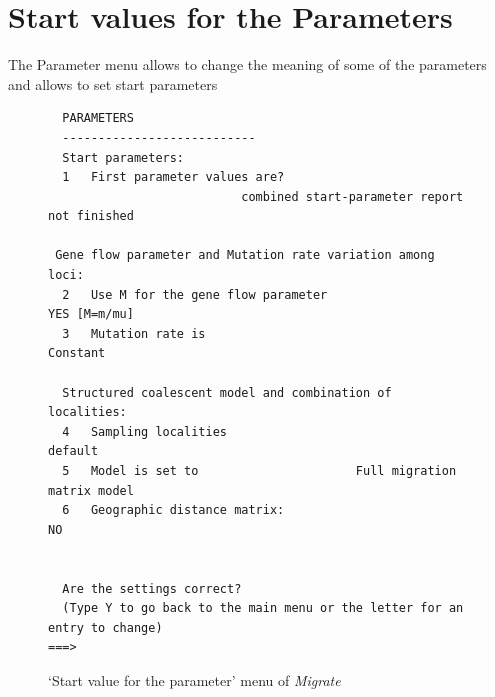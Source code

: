 \section{Start values for the Parameters}
The Parameter menu allows to change the meaning of some of the parameters and allows to set start parameters
\begin{figure}[bht]

\begin{center}

\begin{boxedminipage}{14.5cm}
\begin{small}
\begin{tt}
\begin{verbatim}
  PARAMETERS
  ---------------------------
  Start parameters:
  1   First parameter values are?
                           combined start-parameter report not finished

 Gene flow parameter and Mutation rate variation among loci:
  2   Use M for the gene flow parameter                   YES [M=m/mu]
  3   Mutation rate is                                        Constant

  Structured coalescent model and combination of localities:
  4   Sampling localities                                     default
  5   Model is set to                      Full migration matrix model
  6   Geographic distance matrix:                                   NO


  Are the settings correct?
  (Type Y to go back to the main menu or the letter for an entry to change)
===>
\end{verbatim}
\end{tt}
\end{small}
\end{boxedminipage}
\end{center}
\caption{{\sf `Start value for the parameter' menu of {\it Migrate}}}
\label{STARTM}
\end{figure}

